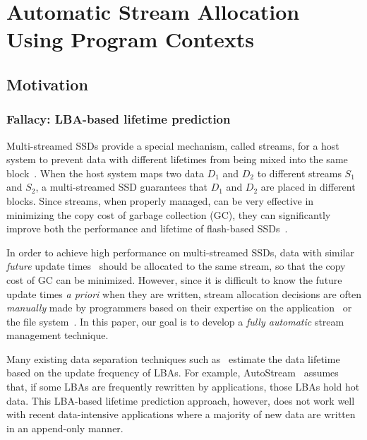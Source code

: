 \chapter{Automatic Stream Allocation Using Program Contexts} 
\label{chap:PCstream}

\section{Motivation}
\subsection{Fallacy: LBA-based lifetime prediction}
Multi-streamed SSDs provide a special mechanism,
called streams, for a host system to prevent data with different lifetimes 
from being mixed into the same block~\cite{T10, MultiStream}.
When the host system maps two data $D_1$ and $D_2$ to 
different streams $S_1$ and $S_2$, a multi-streamed SSD guarantees that 
$D_1$ and $D_2$ are placed in different blocks.   
Since streams, when properly managed, can be very effective in minimizing 
the copy cost of garbage collection (GC), they
can significantly improve both the performance and lifetime of 
flash-based SSDs~\cite{MultiStream, Level, FStream, AutoStream}.

In order to achieve high performance on multi-streamed SSDs, data with similar 
{\it future} update times~\cite{PCHa}
should be allocated 
to the same stream, so that the copy cost of GC can be minimized.
However, since it is difficult to know the future update times {\it a priori} when they are written,
stream allocation decisions are often {\it manually} made 
by programmers based on their expertise
on the application~\cite{MultiStream, Level} or the file system~\cite{FStream}.  
In this paper, our goal is to develop 
a {\it fully automatic} stream management technique. %

Many existing data separation techniques such as~\cite{AutoStream, HotCold} 
estimate the data lifetime based on the update frequency of LBAs.  
For example, \textsf{\small AutoStream}~\cite{AutoStream} assumes that, if
some LBAs are frequently rewritten by applications, those LBAs hold hot data.
This LBA-based lifetime prediction 
approach, however, does not work well with recent data-intensive 
applications where a majority of
new data are written in an append-only manner.  

